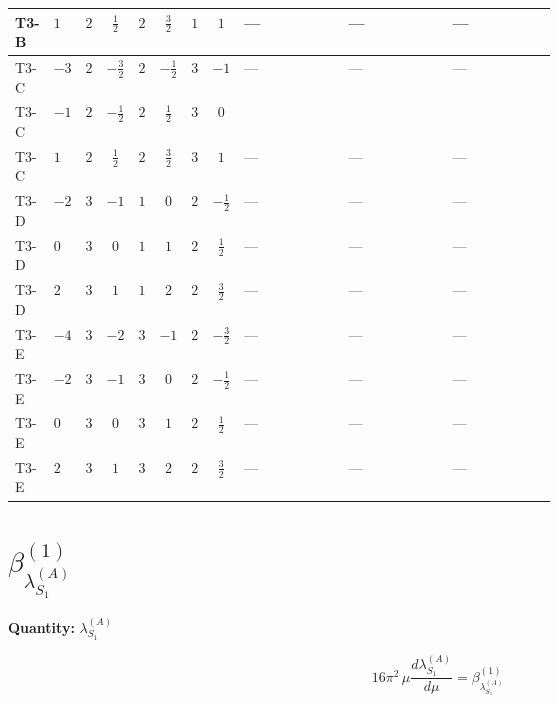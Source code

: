 \documentclass[8pt]{article}
\begin{document}
\begin{landscape}
\begin{longtable}{@{}llcccccc >{\raggedright\arraybackslash}p{0.21\linewidth} >{\raggedright\arraybackslash}p{0.21\linewidth} >{\raggedright\arraybackslash}p{0.21\linewidth}@{}}
\midrule
T3-B & $1$ & $2$ & $\frac{1}{2}$ & $2$ & $\frac{3}{2}$ & $1$ & $1$ & --- & --- & --- \\
\midrule
T3-C & $-3$ & $2$ & $-\frac{3}{2}$ & $2$ & $-\frac{1}{2}$ & $3$ & $-1$ & --- & --- & --- \\
\midrule
T3-C & $-1$ & $2$ & $-\frac{1}{2}$ & $2$ & $\frac{1}{2}$ & $3$ & $0$ & \scriptsize\adjustbox{max width=\linewidth}{$\begin{gathered} +2 {\lambda_{8}} {\lambda_{S_2}^{(1)}}\end{gathered}$} & \scriptsize\adjustbox{max width=\linewidth}{$\begin{gathered} {\lambda_{8}} (3 T_{\nu}^{(2)}+6 \operatorname{Tr}\!\left({Y_d}\,\left({Y_d}\right)^{\dagger}\right)+2 \operatorname{Tr}\!\left({Y_e}\,\left({Y_e}\right)^{\dagger}\right)+6 \operatorname{Tr}\!\left({Y_u}\,\left({Y_u}\right)^{\dagger}\right))\end{gathered}$} & \scriptsize\adjustbox{max width=\linewidth}{$\begin{gathered} +\frac{3}{2} \left({\lambda_5}\right)^{*} \operatorname{Tr}\!\left({y_1}\,\left({y_2}\right)^{\dagger}\right)\end{gathered}$} \\
\midrule
T3-C & $1$ & $2$ & $\frac{1}{2}$ & $2$ & $\frac{3}{2}$ & $3$ & $1$ & --- & --- & --- \\
\midrule
T3-D & $-2$ & $3$ & $-1$ & $1$ & $0$ & $2$ & $-\frac{1}{2}$ & --- & --- & --- \\
\midrule
T3-D & $0$ & $3$ & $0$ & $1$ & $1$ & $2$ & $\frac{1}{2}$ & --- & --- & --- \\
\midrule
T3-D & $2$ & $3$ & $1$ & $1$ & $2$ & $2$ & $\frac{3}{2}$ & --- & --- & --- \\
\midrule
T3-E & $-4$ & $3$ & $-2$ & $3$ & $-1$ & $2$ & $-\frac{3}{2}$ & --- & --- & --- \\
\midrule
T3-E & $-2$ & $3$ & $-1$ & $3$ & $0$ & $2$ & $-\frac{1}{2}$ & --- & --- & --- \\
\midrule
T3-E & $0$ & $3$ & $0$ & $3$ & $1$ & $2$ & $\frac{1}{2}$ & --- & --- & --- \\
\midrule
T3-E & $2$ & $3$ & $1$ & $3$ & $2$ & $2$ & $\frac{3}{2}$ & --- & --- & --- \\
\midrule
\bottomrule
\end{longtable}
\clearpage
\section*{$\beta_{\lambda_{S_1}^{(A)}}^{(1)}$}
\noindent\textbf{Quantity: }$\lambda_{S_1}^{(A)}$\par\smallskip
\[16\pi^2\,\mu\frac{d \lambda_{S_1}^{(A)}}{d\mu}=\beta_{\lambda_{S_1}^{(A)}}^{(1)}\]

\end{landscape}
\end{document}
